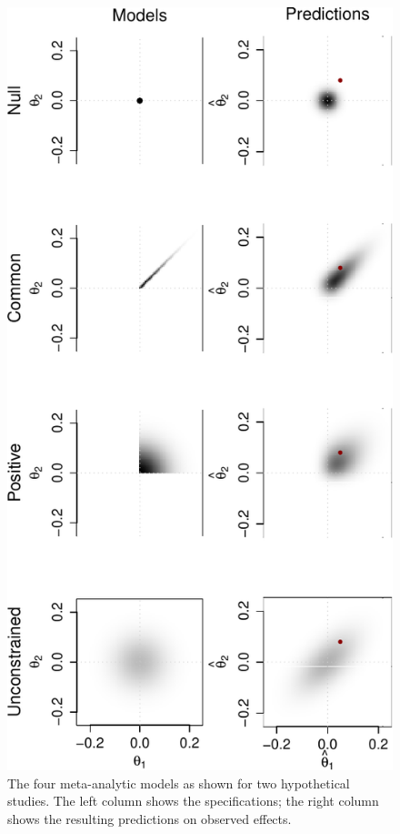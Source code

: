 \documentclass[english,man]{apa6}
\theoremstyle{definition}
\theoremstyle{definition}
\theoremstyle{remark}
\begin{document}
\begin{figure}[htbp]
\centering
\includegraphics{p_files/figure-latex/pred-1.pdf}
\caption{\label{fig:pred}The four meta-analytic models as shown for two
hypothetical studies. The left column shows the specifications; the
right column shows the resulting predictions on observed effects.}
\end{figure}
\end{document}
